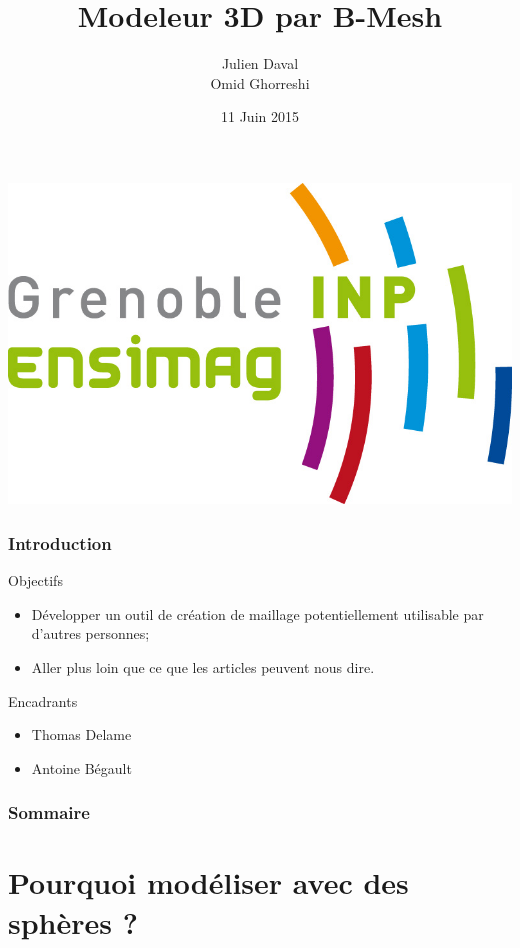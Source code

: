 \documentclass[9pt]{beamer}
\title{Modeleur 3D par B-Mesh}
\author{Julien Daval \\ Omid Ghorreshi}
\institute[Ensimag 2A]{2ème année Ensimag}
\date{11 Juin 2015}
\begin{document}
\begin{frame}
	\titlepage
	\begin{center}
		\includegraphics[scale=0.3]{images/ensimag.jpg}	
	\end{center}

\end{frame}

\begin{frame}
	\frametitle{Introduction}

	\begin{block}{Objectifs}
		\begin{itemize}
			\item Développer un outil de création de maillage potentiellement utilisable par d'autres personnes;
			\item Aller plus loin que ce que les articles peuvent nous dire.
		\end{itemize}			
	\end{block}
	
	\begin{block}{Encadrants}
		\begin{itemize}
			\item Thomas Delame
			\item Antoine Bégault
		\end{itemize}
	\end{block}
\end{frame}


\begin{frame}
	\frametitle{Sommaire}
	\tableofcontents
\end{frame}

\section{Pourquoi modéliser avec des sphères ?}
\end{document}
